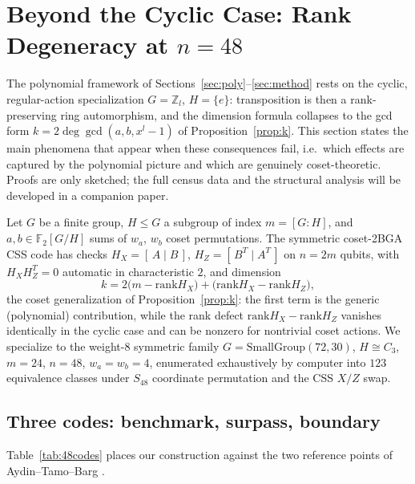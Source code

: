 \documentclass[journal,onecolumn]{IEEEtran}
\theoremstyle{definition}
\theoremstyle{remark}
\newcommand{\F}{\mathbb{F}}
\newcommand{\Z}{\mathbb{Z}}
\newcommand{\rank}{\mathrm{rank}}
\begin{document}
\section{Beyond the Cyclic Case: Rank Degeneracy at \texorpdfstring{$n=48$}{n=48}}\label{sec:rank48}
The polynomial framework of Sections~\ref{sec:poly}--\ref{sec:method} rests
on the cyclic, regular-action specialization $G=\Z_l$, $H=\{e\}$:
transposition is then a rank-preserving ring automorphism, and the
dimension formula collapses to the gcd form $k=2\deg\gcd(a,b,x^l-1)$ of
Proposition~\ref{prop:k}. This section states the main phenomena that
appear when these consequences fail, i.e.\ which effects are captured by
the polynomial picture and which are genuinely coset-theoretic. Proofs are
only sketched; the full census data and the structural analysis will be
developed in a companion paper.

Let $G$ be a finite group, $H\le G$ a subgroup of index $m=[G{:}H]$, and
$a,b\in\F_2[G/H]$ sums of $w_a$, $w_b$ coset permutations. The symmetric
coset-2BGA CSS code has checks $H_X=[\,A\mid B\,]$,
$H_Z=[\,B^{T}\mid A^{T}\,]$ on $n=2m$ qubits, with $H_XH_Z^{T}=0$ automatic
in characteristic $2$, and dimension
\begin{equation}\label{eq:kformula48}
k=2\bigl(m-\rank H_X\bigr)+\bigl(\rank H_X-\rank H_Z\bigr),
\end{equation}
the coset generalization of Proposition~\ref{prop:k}: the first term is the
generic (polynomial) contribution, while the rank defect
$\rank H_X-\rank H_Z$ vanishes identically in the cyclic case and can be
nonzero for nontrivial coset actions. We specialize to the weight-$8$
symmetric family $G=\mathrm{SmallGroup}(72,30)$, $H\cong C_3$, $m=24$,
$n=48$, $w_a=w_b=4$, enumerated exhaustively by computer into $123$
equivalence classes under $S_{48}$ coordinate permutation and the CSS
$X/Z$ swap.

\subsection{Three codes: benchmark, surpass, boundary}
Table~\ref{tab:48codes} places our construction against the two reference
points of Aydin--Tamo--Barg \cite{ATB}.
\end{document}
